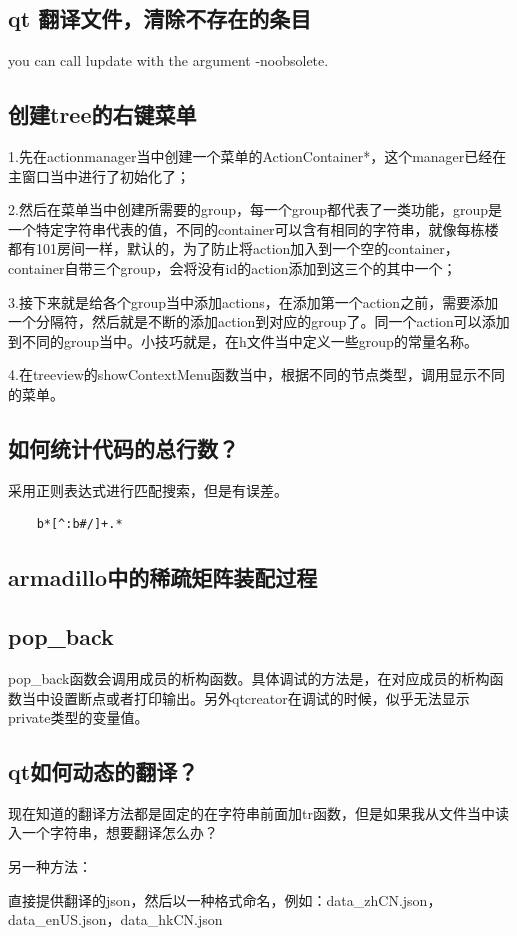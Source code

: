 \subsection{qt 翻译文件，清除不存在的条目}
you can call lupdate with the argument -noobsolete. 
\subsection{创建tree的右键菜单}
1.先在actionmanager当中创建一个菜单的ActionContainer*，这个manager已经在主窗口当中进行了初始化了；

2.然后在菜单当中创建所需要的group，每一个group都代表了一类功能，group是一个特定字符串代表的值，不同的container可以含有相同的字符串，就像每栋楼都有101房间一样，默认的，为了防止将action加入到一个空的container，container自带三个group，会将没有id的action添加到这三个的其中一个；

3.接下来就是给各个group当中添加actions，在添加第一个action之前，需要添加一个分隔符，然后就是不断的添加action到对应的group了。同一个action可以添加到不同的group当中。小技巧就是，在h文件当中定义一些group的常量名称。

4.在treeview的showContextMenu函数当中，根据不同的节点类型，调用显示不同的菜单。
\subsection{如何统计代码的总行数？}
采用正则表达式进行匹配搜索，但是有误差。
\begin{lstlisting}
	b*[^:b#/]+.*
\end{lstlisting}
\subsection{armadillo中的稀疏矩阵装配过程}

\subsection{pop\_back}
pop\_back函数会调用成员的析构函数。具体调试的方法是，在对应成员的析构函数当中设置断点或者打印输出。另外qtcreator在调试的时候，似乎无法显示private类型的变量值。
\subsection{qt如何动态的翻译？}
现在知道的翻译方法都是固定的在字符串前面加tr函数，但是如果我从文件当中读入一个字符串，想要翻译怎么办？

另一种方法：

直接提供翻译的json，然后以一种格式命名，例如：data\_zhCN.json，data\_enUS.json，data\_hkCN.json

